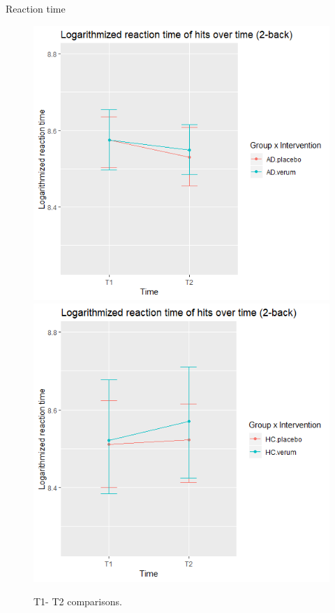 \documentclass{bredelebeamer}
\begin{document}
\begin{frame}{Reaction time}
\begin{figure}
     \includegraphics[scale=0.42]{images/T1T2_Interaction_AD.png} 
     \includegraphics[scale=0.42]{images/T1T2_Interaction_HC.png} 
    \caption{\tiny{T1- T2 comparisons.}}
    \end{figure}
\end{frame}
\end{document}

